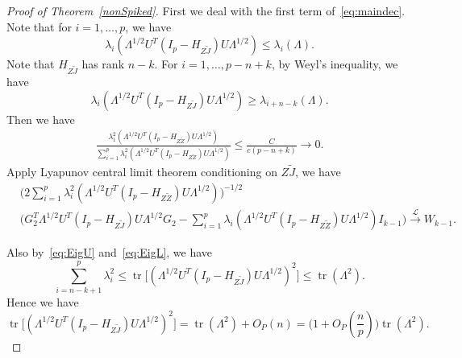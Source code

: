 \documentclass[review]{elsarticle}
\DeclareMathOperator{\mytr}{tr}
\theoremstyle{plain}
\theoremstyle{definition}
\theoremstyle{remark}
\begin{document}
\begin{proof}[\textrm{Proof of Theorem~\ref{nonSpiked}}]
    First we deal with the first term of~\eqref{eq:maindec}.
    Note that for $i=1,\ldots, p$, we have 
    \begin{equation}\label{eq:EigU}
    \lambda_i (\Lambda^{1/2}U^T (I_p-H_{Z\tilde{J}})U\Lambda^{1/2})\leq
    \lambda_i (\Lambda).
    \end{equation}
    Note that $H_{Z\tilde{J}}$ has rank $n-k$. For $i=1,\ldots, p-n+k$, by Weyl's inequality, we have
    \begin{equation}\label{eq:EigL}
    \lambda_i (\Lambda^{1/2}U^T (I_p-H_{Z\tilde{J}})U\Lambda^{1/2})\geq
    \lambda_{i+n-k} (\Lambda).
    \end{equation}
Then we have
    $$
    \begin{aligned}
    \frac{\lambda_1^2(\Lambda^{1/2}U^T(I_p-H_{Z\tilde{Z}})U\Lambda^{1/2})}{\sum_{i=1}^p \lambda_i^2(\Lambda^{1/2}U^T(I_p-H_{Z\tilde{Z}})U\Lambda^{1/2})}
    \leq
        \frac{C}{c(p-n+k)}\to 0.
    \end{aligned}
    $$
    Apply Lyapunov central limit theorem conditioning on $Z\tilde{J}$, we have
    $$
    \begin{aligned}
        &\Big( 2\sum_{i=1}^p \lambda_i^2(\Lambda^{1/2}U^T(I_p-H_{Z\tilde{Z}})U\Lambda^{1/2})\Big)^{-1/2}\\
        &{\Big( G_2^T \Lambda^{1/2}U^T (I_p-H_{Z\tilde{J}})U\Lambda^{1/2}G_2-\sum_{i=1}^p \lambda_i(\Lambda^{1/2}U^T(I_p-H_{Z\tilde{Z}})U\Lambda^{1/2})I_{k-1}\Big)}
    \xrightarrow{\mathcal{L}} W_{k-1}.
    \end{aligned}
    $$

    Also by~\eqref{eq:EigU} and~\eqref{eq:EigL}, we have
    $$
    \sum_{i=n-k+1}^p \lambda_i^2
    \leq
    \mytr\big[(\Lambda^{1/2}U^T (I_p-H_{Z\tilde{J}})U\Lambda^{1/2})^2\big]\leq
    \mytr(\Lambda^2).
    $$ 
    Hence we have
    $$
    \mytr\big[(\Lambda^{1/2}U^T (I_p-H_{Z\tilde{J}})U\Lambda^{1/2})^2\big]
    =
    \mytr(\Lambda^2)+O_P(n)
    =
    \big(1+O_P(\frac{n}{p})\big)\mytr(\Lambda^2).
    $$ 


\end{proof}
\end{document}

